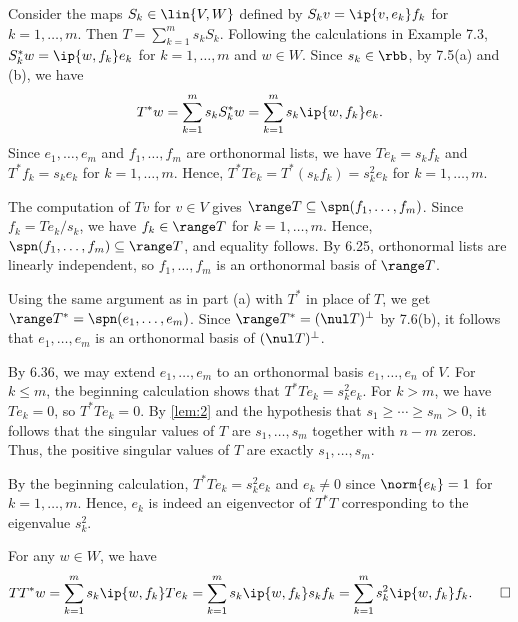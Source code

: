 \begin{sol}
    Consider the maps $S_k \in \lin{V, W}$ defined by $S_k v = \ip{v, e_k} f_k$ for $k = 1, \ldots, m$.
    Then $T = \sum_{k=1}^m s_k S_k$.
    Following the calculations in Example 7.3, $S_k^\ast w = \ip{w, f_k} e_k$ for $k = 1, \ldots, m$ and $w \in W$.
    Since $s_k \in \rbb$, by 7.5(a) and (b), we have
    \[
        T^\ast w = \sum_{k=1}^m s_k S_k^\ast w = \sum_{k=1}^m s_k \ip{w, f_k} e_k.
    \]
    Since $e_1, \ldots, e_m$ and $f_1, \ldots, f_m$ are orthonormal lists, we have $T e_k = s_k f_k$ and $T^\ast f_k = s_k e_k$ for $k = 1, \ldots, m$.
    Hence, $T^\ast T e_k = T^\ast(s_k f_k) = s_k^2 e_k$ for $k = 1, \ldots, m$.
    \begin{subexercises}
        \item The computation of $T v$ for $v \in V$ gives $\range T \subseteq \spn(f_1, \ldots, f_m)$.
        Since $f_k = T e_k / s_k$, we have $f_k \in \range T$ for $k = 1, \ldots, m$.
        Hence, $\spn(f_1, \ldots, f_m) \subseteq \range T$, and equality follows.
        By 6.25, orthonormal lists are linearly independent, so $f_1, \ldots, f_m$ is an orthonormal basis of $\range T$.
        \item Using the same argument as in part (a) with $T^\ast$ in place of $T$, we get $\range T^\ast = \spn(e_1, \ldots, e_m)$.
        Since $\range T^\ast = (\nul T)^\perp$ by 7.6(b), it follows that $e_1, \ldots, e_m$ is an orthonormal basis of $(\nul T)^\perp$.
        \item By 6.36, we may extend $e_1, \ldots, e_m$ to an orthonormal basis $e_1, \ldots, e_n$ of $V$.
        For $k \leq m$, the beginning calculation shows that $T^\ast T e_k = s_k^2 e_k$.
        For $k > m$, we have $T e_k = 0$, so $T^\ast T e_k = 0$.
        By \autoref{lem:2} and the hypothesis that $s_1 \geq \cdots \geq s_m > 0$, it follows that the singular values of $T$ are $s_1, \ldots, s_m$ together with $n-m$ zeros.
        Thus, the positive singular values of $T$ are exactly $s_1, \ldots, s_m$.
        \item By the beginning calculation, $T^\ast T e_k = s_k^2 e_k$ and $e_k \neq 0$ since $\norm{e_k} = 1$ for $k = 1, \ldots, m$.
        Hence, $e_k$ is indeed an eigenvector of $T^\ast T$ corresponding to the eigenvalue $s_k^2$.
        \item For any $w \in W$, we have
        \[
            T T^\ast w = \sum_{k=1}^m s_k \ip{w, f_k} T e_k = \sum_{k=1}^m s_k \ip{w, f_k} s_k f_k = \sum_{k=1}^m s_k^2 \ip{w, f_k} f_k. \qedhere
        \]
    \end{subexercises}
\end{sol}

